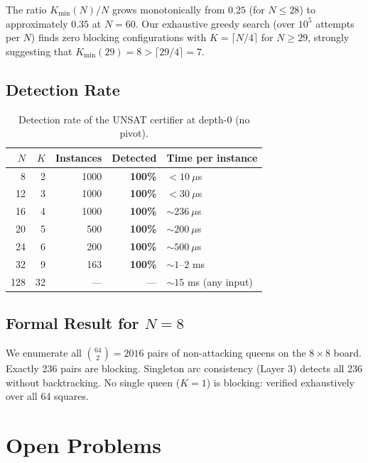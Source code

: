 \documentclass[11pt]{article}
\begin{document}
The ratio $K_{\min}(N)/N$ grows monotonically from $0.25$ (for $N \leq 28$)
to approximately $0.35$ at $N = 60$.
Our exhaustive greedy search (over $10^5$ attempts per $N$) finds zero
blocking configurations with $K = \lceil N/4 \rceil$ for $N \geq 29$,
strongly suggesting that $K_{\min}(29) = 8 > \lceil 29/4 \rceil = 7$.

\subsection{Detection Rate}

\begin{table}[h]
\centering
\caption{Detection rate of the UNSAT certifier at depth-0 (no pivot).}
\label{tab:detection}
\begin{tabular}{rrrrl}
\toprule
$N$ & $K$ & Instances & Detected & Time per instance \\
\midrule
8   & 2  & 1000 & \textbf{100\%} & $<10\ \mu$s \\
12  & 3  & 1000 & \textbf{100\%} & $<30\ \mu$s \\
16  & 4  & 1000 & \textbf{100\%} & $\sim 236\ \mu$s \\
20  & 5  & 500  & \textbf{100\%} & $\sim 200\ \mu$s \\
24  & 6  & 200  & \textbf{100\%} & $\sim 500\ \mu$s \\
32  & 9  & 163  & \textbf{100\%} & $\sim 1$--$2$ ms \\
128 & 32 & ---  & ---            & $\sim 15$ ms (any input) \\
\bottomrule
\end{tabular}
\end{table}

\subsection{Formal Result for $N = 8$}

We enumerate all $\binom{64}{2} = 2016$ pairs of non-attacking queens on
the $8 \times 8$ board. Exactly 236 pairs are blocking.
Singleton arc consistency (Layer 3) detects all 236 without backtracking.
No single queen ($K=1$) is blocking: verified exhaustively over all 64 squares.

\section{Open Problems}
\end{document}
